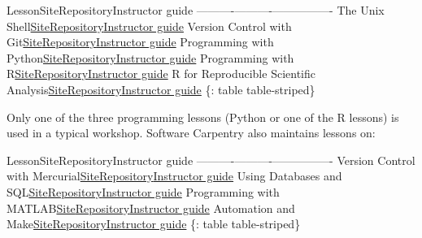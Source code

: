 \textbar{}Lesson\textbar{}Site\textbar{}Repository\textbar{}Instructor
guide\textbar{}
\textbar{}------\textbar{}----\textbar{}----------\textbar{}----------------\textbar{}
\textbar{}The Unix
Shell\textbar{}\href{\{\{site.swc_pages\}\}/shell-novice/}{Site}\textbar{}\href{https://github.com/swcarpentry/shell-novice}{Repository}\textbar{}\href{\{\{site.swc_pages\}\}/shell-novice/guide/}{Instructor
guide} \textbar{}Version Control with
Git\textbar{}\href{\{\{site.swc_pages\}\}/git-novice/}{Site}\textbar{}\href{https://github.com/swcarpentry/git-novice}{Repository}\textbar{}\href{\{\{site.swc_pages\}\}/git-novice/guide/}{Instructor
guide}\textbar{} \textbar{}Programming with
Python\textbar{}\href{\{\{site.swc_pages\}\}/python-novice-inflammation/}{Site}\textbar{}\href{https://github.com/swcarpentry/python-novice-inflammation}{Repository}\textbar{}\href{\{\{site.swc_pages\}\}/python-novice-inflammation/guide/}{Instructor
guide}\textbar{} \textbar{}Programming with
R\textbar{}\href{\{\{site.swc_pages\}\}/r-novice-inflammation/}{Site}\textbar{}\href{https://github.com/swcarpentry/r-novice-inflammation}{Repository}\textbar{}\href{\{\{site.swc_pages\}\}/r-novice-inflammation/guide/}{Instructor
guide}\textbar{} \textbar{}R for Reproducible Scientific
Analysis\textbar{}\href{\{\{site.swc_pages\}\}/r-novice-gapminder/}{Site}\textbar{}\href{https://github.com/swcarpentry/r-novice-gapminder}{Repository}\textbar{}\href{\{\{site.swc_pages\}\}/r-novice-gapminder/guide/}{Instructor
guide}\textbar{} \{: table table-striped\}

Only one of the three programming lessons (Python or one of the R
lessons) is used in a typical workshop. Software Carpentry also
maintains lessons on:

\textbar{}Lesson\textbar{}Site\textbar{}Repository\textbar{}Instructor
guide\textbar{}
\textbar{}------\textbar{}----\textbar{}----------\textbar{}----------------\textbar{}
\textbar{}Version Control with
Mercurial\textbar{}\href{\{\{site.swc_pages\}\}/hg-novice/}{Site}\textbar{}\href{https://github.com/swcarpentry/hg-novice}{Repository}\textbar{}\href{\{\{site.swc_pages\}\}/hg-novice/guide/}{Instructor
guide} \textbar{}Using Databases and
SQL\textbar{}\href{\{\{site.swc_pages\}\}/sql-novice-survey/}{Site}\textbar{}\href{https://github.com/swcarpentry/sql-novice-survey}{Repository}\textbar{}\href{\{\{site.swc_pages\}\}/sql-novice-survey/guide/}{Instructor
guide} \textbar{}Programming with
MATLAB\textbar{}\href{\{\{site.swc_pages\}\}/matlab-novice-inflammation/}{Site}\textbar{}\href{https://github.com/swcarpentry/matlab-novice-inflammation}{Repository}\textbar{}\href{\{\{site.swc_pages\}\}/matlab-novice-inflammation/guide/}{Instructor
guide} \textbar{}Automation and
Make\textbar{}\href{\{\{site.swc_pages\}\}/make-novice/}{Site}\textbar{}\href{https://github.com/swcarpentry/make-novice}{Repository}\textbar{}\href{\{\{site.swc_pages\}\}/make-novice/guide/}{Instructor
guide} \{: table table-striped\}

